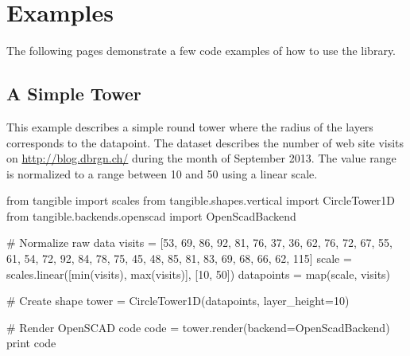
\chapter{Examples}

\label{ch:examples}

The following pages demonstrate a few code examples of how to use the
\tangible{} library.


\section{A Simple Tower}\label{sec:tower}

This example describes a simple round tower where the radius of the layers
corresponds to the datapoint. The dataset describes the number of web site
visits on \url{http://blog.dbrgn.ch/} during the month of September 2013. The
value range is normalized to a range between 10 and 50 using a linear scale.

\vspace{.5\baselineskip}
\begin{pythoncode}
from tangible import scales
from tangible.shapes.vertical import CircleTower1D
from tangible.backends.openscad import OpenScadBackend

# Normalize raw data
visits = [53, 69, 86, 92, 81, 76, 37, 36, 62, 76, 72, 67, 55, 61, 54,
          72, 92, 84, 78, 75, 45, 48, 85, 81, 83, 69, 68, 66, 62, 115]
scale = scales.linear([min(visits), max(visits)], [10, 50])
datapoints = map(scale, visits)

# Create shape
tower = CircleTower1D(datapoints, layer_height=10)

# Render OpenSCAD code
code = tower.render(backend=OpenScadBackend)
print code
\end{pythoncode}
\vspace{.5\baselineskip}

